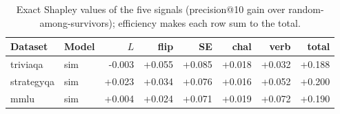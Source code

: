 \begin{table}[t]
\centering
\small
\begin{tabular}{llrrrrrr}
\toprule
Dataset & Model & $L$ & flip & SE & chal & verb & total \\
\midrule
triviaqa & sim & -0.003 & +0.055 & +0.085 & +0.018 & +0.032 & +0.188 \\
strategyqa & sim & +0.023 & +0.034 & +0.076 & +0.016 & +0.052 & +0.200 \\
mmlu & sim & +0.004 & +0.024 & +0.071 & +0.019 & +0.072 & +0.190 \\
\bottomrule
\end{tabular}
\caption{Exact Shapley values of the five signals (precision@10 gain over random-among-survivors); efficiency makes each row sum to the total.}
\label{tab:shapley}
\end{table}
